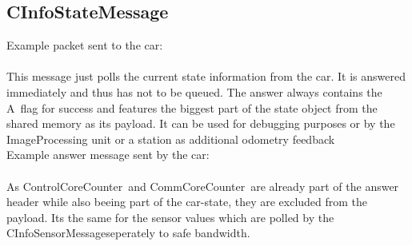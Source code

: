 \subsection*{CInfoStateMessage}
Example packet sent to the car:\\
 \\
\newline
\newline
This message just polls the current state information from the car. It is answered immediately and thus has not to be queued. The answer always contains the \glqq A\grqq \ flag for success and features the biggest part of the state object from the shared memory as its payload. It can be used for debugging purposes or by the ImageProcessing unit or a station as additional odometry feedback\\
\newline
Example answer message sent by the car:\\
\\
\newline
As \glqq ControlCoreCounter\grqq \ and \glqq CommCoreCounter\grqq \ are already part of the answer header while also beeing part of the car-state, they are excluded from the payload. Its the same for the sensor values which are polled by the \glqq CInfoSensorMessage\grqq seperately to safe bandwidth.

